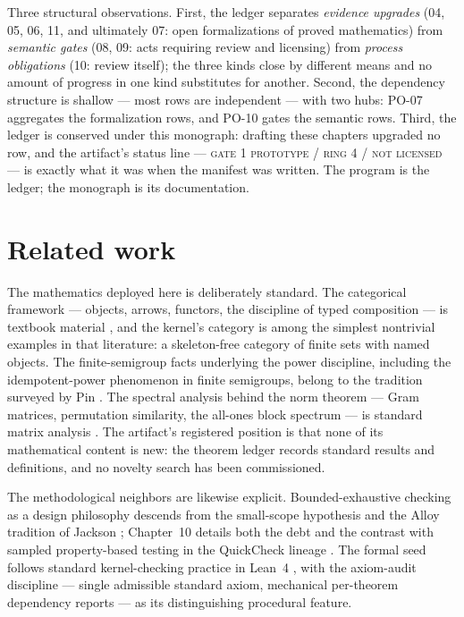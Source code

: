 Three structural observations. First, the ledger separates
\emph{evidence upgrades} (04, 05, 06, 11, and ultimately 07: open
formalizations of proved mathematics) from \emph{semantic gates} (08,
09: acts requiring review and licensing) from \emph{process
obligations} (10: review itself); the three kinds close by different
means and no amount of progress in one kind substitutes for another.
Second, the dependency structure is shallow --- most rows are
independent --- with two hubs: PO-07 aggregates the formalization
rows, and PO-10 gates the semantic rows. Third, the ledger is
conserved under this monograph: drafting these chapters upgraded no
row, and the artifact's status line --- \textsc{gate 1 prototype /
ring 4 / not licensed} --- is exactly what it was when the manifest
was written. The program is the ledger; the monograph is its
documentation.

\section{Related work}\label{ch12:sec:related}

The mathematics deployed here is deliberately standard. The categorical
framework --- objects, arrows, functors, the discipline of typed
composition --- is textbook material \cite{maclanecwm}, and the kernel's
category is among the simplest nontrivial examples in that literature: a
skeleton-free category of finite sets with named objects. The
finite-semigroup facts underlying the power discipline, including the
idempotent-power phenomenon in finite semigroups, belong to the
tradition surveyed by Pin \cite{pin}. The spectral analysis behind the
norm theorem --- Gram matrices, permutation similarity, the all-ones
block spectrum --- is standard matrix analysis \cite{horn}. The
artifact's registered position is that none of its mathematical content
is new: the theorem ledger records standard results and definitions,
and no novelty search has been commissioned.

The methodological neighbors are likewise explicit. Bounded-exhaustive
checking as a design philosophy descends from the small-scope
hypothesis and the Alloy tradition of Jackson \cite{jackson};
Chapter~10 details both the debt and the contrast with sampled
property-based testing in the QuickCheck lineage \cite{quickcheck}.
The formal seed follows standard kernel-checking practice in Lean~4
\cite{lean4}, with the axiom-audit discipline --- single admissible
standard axiom, mechanical per-theorem dependency reports --- as its
distinguishing procedural feature.

